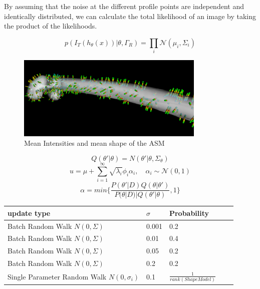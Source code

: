 \documentclass{article}
\begin{document}
	By assuming that the noise at the different profile points are independent and identically distributed, we can calculate the total likelihood of an image by taking the product of the likelihoods.
	
	
	\begin{equation}
	p(I_T(h_\theta (x))|\theta, \Gamma_R) = \prod_{i} \mathcal{N}(\mu_i, \Sigma_i)
	\end{equation}
	
	
	
	\begin{figure}
		\centering
			\centering
			\includegraphics[width=0.8\textwidth]{images/mean_pixelintensities.png}
			\caption{Mean Intensities and mean shape of the ASM}
			\label{1.1}
	\end{figure}	
	\begin{equation}
	Q(\theta' | \theta) = N(\theta'|\theta, \Sigma_\theta)
	\end{equation}
	\begin{equation}
	u = \mu + \sum_{i=1}^\infty \sqrt{\lambda_i} \phi_i \alpha_i, \quad \alpha_i \sim{} \mathcal{N}(0,1)
	\end{equation}
	\begin{equation}
		\alpha = min \{ \frac{P(\theta' | D ) Q(\theta|\theta')}{P(\theta|D) | Q(\theta'|\theta)}, 1\}
	\end{equation}
	\begin{center}
		\begin{tabular}{l l l l l}
			\toprule
			update type & $\sigma$ & Probability \\
			\midrule
			Batch Random Walk $N(0, \Sigma)$&  0.001 & 	0.2  	\\
			Batch Random Walk $N(0, \Sigma)$& 0.01 & 	0.4 	\\
			Batch Random Walk $N(0, \Sigma)$& 0.05 &	0.2		\\
			Batch Random Walk $N(0, \Sigma)$& 0.2&		0.2		\\
			Single Parameter Random Walk $N(0,\sigma_i)$ & 0.1& $\frac{1}{rank(ShapeModel)}$
		\end{tabular}
	\end{center}
\end{document}
